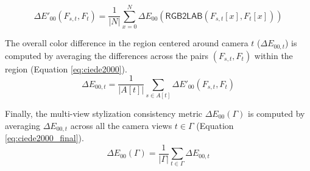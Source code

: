 \begin{equation}
	\label{eq:average_ciede2000}
	\Delta E'_{00}(F_{s,t}, F_t) = \frac{1}{\vert N \vert} \sum_{x=0}^N \Delta E_{00}(\mathsf{RGB2LAB}(F_{s,t}[x], F_t[x]))
\end{equation}

The overall color difference in the region centered around camera $t$ ($\Delta E_{00,t}$) is computed by averaging the differences across the pairs $(F_{s,t}, F_t)$ within the region (Equation \ref{eq:ciede2000}).
\begin{equation}
	\label{eq:ciede2000}
	\Delta E_{00,t}= \frac{1}{\vert A[t] \vert} \sum_{s \in A[t]} \Delta E'_{00}(F_{s,t}, F_t)
\end{equation}

Finally, the multi-view stylization consistency metric $\Delta E_{00}(\varGamma )$ is computed by averaging $\Delta E_{00,t}$ across all the camera views $t \in \varGamma $ (Equation \ref{eq:ciede2000_final}).
\begin{equation}
	\label{eq:ciede2000_final}
	\Delta E_{00}(\varGamma ) = \frac{1}{\vert \varGamma  \vert} \sum_{t \in \varGamma } \Delta E_{00,t}
\end{equation}